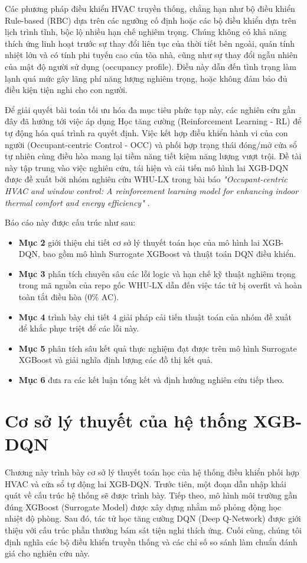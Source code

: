 \documentclass[12pt, a4paper]{article}
\begin{document}
Các phương pháp điều khiển HVAC truyền thống, chẳng hạn như bộ điều khiển Rule-based (RBC) dựa trên các ngưỡng cố định hoặc các bộ điều khiển dựa trên lịch trình tĩnh, bộc lộ nhiều hạn chế nghiêm trọng. Chúng không có khả năng thích ứng linh hoạt trước sự thay đổi liên tục của thời tiết bên ngoài, quán tính nhiệt lớn và có tính phi tuyến cao của tòa nhà, cũng như sự thay đổi ngẫu nhiên của mật độ người sử dụng (occupancy profile). Điều này dẫn đến tình trạng làm lạnh quá mức gây lãng phí năng lượng nghiêm trọng, hoặc không đảm bảo đủ điều kiện tiện nghi cho con người.

Để giải quyết bài toán tối ưu hóa đa mục tiêu phức tạp này, các nghiên cứu gần đây đã hướng tới việc áp dụng Học tăng cường (Reinforcement Learning - RL) để tự động hóa quá trình ra quyết định. Việc kết hợp điều khiển hành vi của con người (Occupant-centric Control - OCC) và phối hợp trạng thái đóng/mở cửa sổ tự nhiên cùng điều hòa mang lại tiềm năng tiết kiệm năng lượng vượt trội. Đề tài này tập trung vào việc nghiên cứu, tái hiện và cải tiến mô hình lai XGB-DQN được đề xuất bởi nhóm nghiên cứu WHU-LX trong bài báo \textit{"Occupant-centric HVAC and window control: A reinforcement learning model for enhancing indoor thermal comfort and energy efficiency"} \cite{whulx}. 

Báo cáo này được cấu trúc như sau:
\begin{itemize}
    \item \textbf{Mục 2} giới thiệu chi tiết cơ sở lý thuyết toán học của mô hình lai XGB-DQN, bao gồm mô hình Surrogate XGBoost và thuật toán DQN điều khiển.
    \item \textbf{Mục 3} phân tích chuyên sâu các lỗi logic và hạn chế kỹ thuật nghiêm trọng trong mã nguồn của repo gốc WHU-LX dẫn đến việc tác tử bị overfit và hoàn toàn tắt điều hòa (0\% AC).
    \item \textbf{Mục 4} trình bày chi tiết 4 giải pháp cải tiến thuật toán của nhóm đề xuất để khắc phục triệt để các lỗi này.
    \item \textbf{Mục 5} phân tích sâu kết quả thực nghiệm đạt được trên mô hình Surrogate XGBoost và giải nghĩa định lượng các đồ thị kết quả.
    \item \textbf{Mục 6} đưa ra các kết luận tổng kết và định hướng nghiên cứu tiếp theo.
\end{itemize}

\section{Cơ sở lý thuyết của hệ thống XGB-DQN}
Chương này trình bày cơ sở lý thuyết toán học của hệ thống điều khiển phối hợp HVAC và cửa sổ tự động lai XGB-DQN. Trước tiên, một đoạn dẫn nhập khái quát về cấu trúc hệ thống sẽ được trình bày. Tiếp theo, mô hình môi trường gần đúng XGBoost (Surrogate Model) được xây dựng nhằm mô phỏng động học nhiệt độ phòng. Sau đó, tác tử học tăng cường DQN (Deep Q-Network) được giới thiệu với cấu trúc phần thưởng bám sát tiện nghi thích ứng. Cuối cùng, chúng tôi định nghĩa các bộ điều khiển truyền thống và các chỉ số so sánh làm chuẩn đánh giá cho nghiên cứu này.
\end{document}
